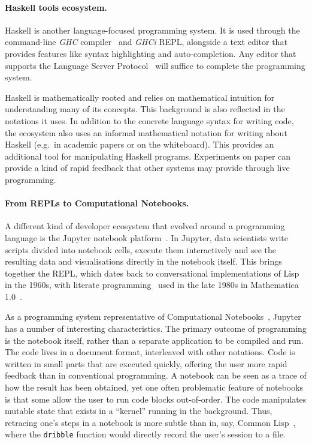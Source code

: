 \paragraph{Haskell tools ecosystem.}

Haskell is another language-focused programming system. It is used
through the command-line \emph{GHC} compiler~\cite{GHC} and \emph{GHCi}
REPL, alongside a text editor that provides features like syntax
highlighting and auto-completion. Any editor that supports the Language
Server Protocol~\cite{LSP} will suffice to complete the programming
system.

Haskell is mathematically rooted and relies on mathematical intuition
for understanding many of its concepts. This background is also
reflected in the notations it uses. In addition to the concrete language
syntax for writing code, the ecosystem also uses an informal
mathematical notation for writing about Haskell (e.g.~in academic papers
or on the whiteboard). This provides an additional tool for manipulating
Haskell programs. Experiments on paper can provide a kind of rapid
feedback that other systems may provide through live programming.

\paragraph{From REPLs to Computational Notebooks.}

A different kind of developer ecosystem that evolved around a
programming language is the Jupyter notebook platform~\cite{Jupyter}. In
Jupyter, data scientists write scripts divided into notebook cells,
execute them interactively and see the resulting data and visualisations
directly in the notebook itself. This brings together the REPL, which
dates back to conversational implementations of Lisp in the 1960s, with
literate programming~\cite{LiterateProg} used in the late 1980s in
Mathematica 1.0~\cite{Mathematica}.

As a programming system representative of Computational
Notebooks~\cite{CompNotebooks}, Jupyter has a number of interesting
characteristics. The primary outcome of programming is the notebook
itself, rather than a separate application to be compiled and run. The
code lives in a document format, interleaved with other notations. Code
is written in small parts that are executed quickly, offering the user
more rapid feedback than in conventional programming. A notebook can be
seen as a trace of how the result has been obtained, yet one often
problematic feature of notebooks is that some allow the user to run code
blocks out-of-order. The code manipulates mutable state that exists in a
``kernel'' running in the background. Thus, retracing one's steps in a
notebook is more subtle than in, say, Common Lisp~\cite{CommonLisp},
where the \texttt{dribble} function would directly record the user's
session to a file.

